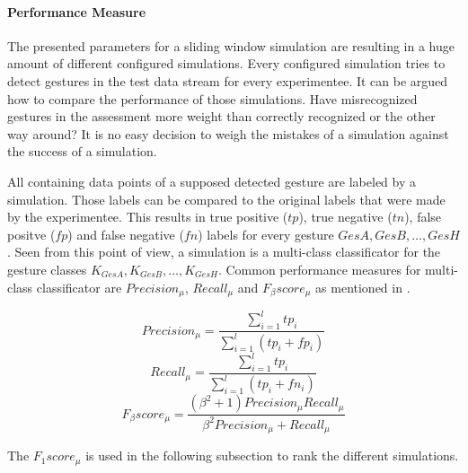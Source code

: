 \paragraph{Performance Measure} \label{performance_measure}
The presented parameters for a sliding window simulation are resulting in a huge amount of different configured
simulations. Every configured simulation tries to detect gestures in the test data stream for every experimentee. It can
be argued how to compare the performance of those simulations. Have misrecognized gestures in the assessment more weight
than correctly recognized or the other way around? It is no easy decision to weigh the mistakes of a simulation against
the success of a simulation.

All containing data points of a supposed detected gesture are labeled by a simulation. Those labels can be compared
to the original labels that were made by the experimentee. This results in true positive ($tp$), true negative
($tn$), false positve ($fp$) and false negative ($fn$) labels for every gesture $GesA, GesB, \dots, GesH$. Seen from
this point of view, a simulation is a multi-class classificator for the gesture classes
$K_{GesA}, K_{GesB}, \dots, K_{GesH}$. Common performance measures for multi-class classificator are $Precision_{\mu}$,
$Recall_{\mu}$ and $F_{\beta}score_{\mu}$ as mentioned in \cite{sokolova2009systematic}.

\begin{equation}
    Precision_{\mu} = \frac{\sum \limits_{i=1}^{l} tp_i}{\sum \limits_{i=1}^{l} (tp_i + fp_i)}
\end{equation}
\begin{equation}
    Recall_{\mu} = \frac{\sum \limits_{i=1}^{l} tp_i}{\sum \limits_{i=1}^{l} (tp_i + fn_i)}
\end{equation}
\begin{equation}
    F_{\beta}score_{\mu} = \frac{(\beta^2 + 1)Precision_{\mu} Recall_{\mu}}{\beta^2 Precision_{\mu} + Recall_{\mu}}
\end{equation}

The $F_{1}score_{\mu}$ is used in the following subsection to rank the different simulations.

